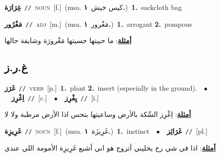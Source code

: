 \documentclass[10pt,a4paper,twoside]{article} %
\begin{document}
\begin{multicols}{2}
{\setlength\topsep{0pt}\textbf{\foreignlanguage{arabic}{غِرَارَة}}\ {\color{gray}\texttt{//}\color{black}}\ \textsc{noun}\ [f.]\ \color{gray}(msa. \foreignlanguage{arabic}{كيس خيش}~\foreignlanguage{arabic}{\textbf{١.}})\color{black}\ \textbf{1.}~sackcloth bag\ } \vspace{2mm}

{\setlength\topsep{0pt}\textbf{\foreignlanguage{arabic}{مَغْرُور}}\ {\color{gray}\texttt{//}\color{black}}\ \textsc{adj}\ [m.]\ \color{gray}(msa. \foreignlanguage{arabic}{مَغْرور}~\foreignlanguage{arabic}{\textbf{١.}})\color{black}\ \textbf{1.}~arrogant  \textbf{2.}~pompous\  \begin{flushright}\color{gray}\foreignlanguage{arabic}{\textbf{\underline{\foreignlanguage{arabic}{أمثلة}}}: ما حبيتها حسيتها مَغْرورَة وشايفة حالها}\end{flushright}\color{black}} \vspace{2mm}

\vspace{-3mm}
\subsection*{\color{blue}\foreignlanguage{arabic}{غ.ر.ز}\color{blue}{}} 

{\setlength\topsep{0pt}\textbf{\foreignlanguage{arabic}{غَرَز}}\ {\color{gray}\texttt{//}\color{black}}\ \textsc{verb}\ [p.]\ \textbf{1.}~plant  \textbf{2.}~insert (especially in the ground).\ \ $\bullet$\ \ \setlength\topsep{0pt}\textbf{\foreignlanguage{arabic}{اِغْرِز}}\ {\color{gray}\texttt{//}\color{black}}\ [c.]\ \ $\bullet$\ \ \setlength\topsep{0pt}\textbf{\foreignlanguage{arabic}{يِغْرِز}}\ {\color{gray}\texttt{//}\color{black}}\ [i.]\  \begin{flushright}\color{gray}\foreignlanguage{arabic}{\textbf{\underline{\foreignlanguage{arabic}{أمثلة}}}: اِغْرِز السِّكة بالأرض وساعيتها بتحس اذا الأرض مرطبة ولا لا}\end{flushright}\color{black}} \vspace{2mm}

{\setlength\topsep{0pt}\textbf{\foreignlanguage{arabic}{غَرِيزِة}}\ {\color{gray}\texttt{//}\color{black}}\ \textsc{noun}\ [f.]\ \color{gray}(msa. \foreignlanguage{arabic}{غَرِيزَة}~\foreignlanguage{arabic}{\textbf{١.}})\color{black}\ \textbf{1.}~instinct\ \ $\bullet$\ \ \setlength\topsep{0pt}\textbf{\foreignlanguage{arabic}{غَرَائِز}}\ {\color{gray}\texttt{//}\color{black}}\ [pl.]\  \begin{flushright}\color{gray}\foreignlanguage{arabic}{\textbf{\underline{\foreignlanguage{arabic}{أمثلة}}}: اذا في شي رح يخليني أتزوج هو اني أشبع غَرِيزِة الأمومة اللي عندي}\end{flushright}\color{black}} \vspace{2mm}


\end{multicols}
\end{document}
